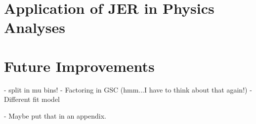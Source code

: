 \section{Application of JER in Physics Analyses}



\section{Future Improvements}

- split in mu bins!
- Factoring in GSC (hmm...I have to think about that again!)
- Different fit model

- Maybe put that in an appendix.